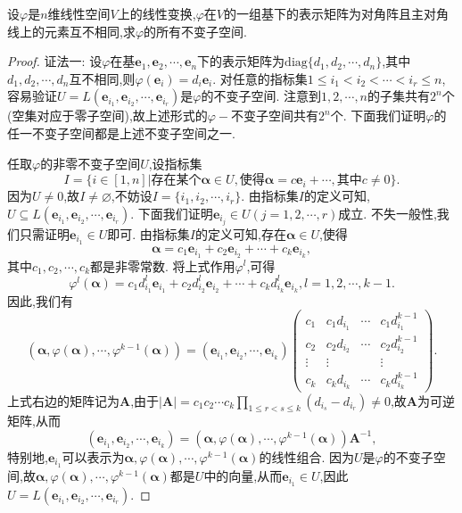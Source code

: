 \documentclass[../../main.tex]{subfiles}%
\begin{document}
\begin{example}
设\(\varphi\)是\(n\)维线性空间\(V\)上的线性变换,\(\varphi\)在\(V\)的一组基下的表示矩阵为对角阵且主对角线上的元素互不相同,求\(\varphi\)的所有不变子空间.
\end{example}
\begin{proof}

{\color{blue}证法一:}
设\(\varphi\)在基\(\boldsymbol{e}_1,\boldsymbol{e}_2,\cdots,\boldsymbol{e}_n\)下的表示矩阵为\(\text{diag}\{d_1,d_2,\cdots,d_n\}\),其中\(d_1,d_2,\cdots,d_n\)互不相同,则\(\varphi(\boldsymbol{e}_i)=d_i\boldsymbol{e}_i\). 对任意的指标集\(1\leqslant  i_1 < i_2 < \cdots < i_r\leqslant  n\),容易验证\(U = L(\boldsymbol{e}_{i_1},\boldsymbol{e}_{i_2},\cdots,\boldsymbol{e}_{i_r})\)是\(\varphi\)的不变子空间. 注意到\(1,2,\cdots,n\)的子集共有\(2^n\)个(空集对应于零子空间),故上述形式的\(\varphi -\)不变子空间共有\(2^n\)个. 下面我们证明\(\varphi\)的任一不变子空间都是上述不变子空间之一.

任取\(\varphi\)的非零不变子空间\(U\),设指标集
\[
I = \{i\in[1,n]|\text{存在某个}\boldsymbol{\alpha}\in U,\text{使得}\boldsymbol{\alpha}=c\boldsymbol{e}_i + \cdots,\text{其中}c\neq 0\}.
\]
因为\(U\neq 0\),故\(I\neq\varnothing\),不妨设\(I = \{i_1,i_2,\cdots,i_r\}\). 由指标集\(I\)的定义可知,\(U\subseteq L(\boldsymbol{e}_{i_1},\boldsymbol{e}_{i_2},\cdots,\boldsymbol{e}_{i_r})\). 下面我们证明\(\boldsymbol{e}_{i_j}\in U(j = 1,2,\cdots,r)\)成立. 不失一般性,我们只需证明\(\boldsymbol{e}_{i_1}\in U\)即可. 由指标集\(I\)的定义可知,存在\(\boldsymbol{\alpha}\in U\),使得
\[
\boldsymbol{\alpha}=c_1\boldsymbol{e}_{i_1}+c_2\boldsymbol{e}_{i_2}+\cdots + c_k\boldsymbol{e}_{i_k},
\]
其中\(c_1,c_2,\cdots,c_k\)都是非零常数. 将上式作用\(\varphi^l\),可得
\[
\varphi^l(\boldsymbol{\alpha})=c_1d_{i_1}^l\boldsymbol{e}_{i_1}+c_2d_{i_2}^l\boldsymbol{e}_{i_2}+\cdots + c_kd_{i_k}^l\boldsymbol{e}_{i_k},l = 1,2,\cdots,k - 1.
\]
因此,我们有
\[
(\boldsymbol{\alpha},\varphi(\boldsymbol{\alpha}),\cdots,\varphi^{k - 1}(\boldsymbol{\alpha}))=(\boldsymbol{e}_{i_1},\boldsymbol{e}_{i_2},\cdots,\boldsymbol{e}_{i_k})
\begin{pmatrix}
c_1&c_1d_{i_1}&\cdots&c_1d_{i_1}^{k - 1}\\
c_2&c_2d_{i_2}&\cdots&c_2d_{i_2}^{k - 1}\\
\vdots&\vdots&&\vdots\\
c_k&c_kd_{i_k}&\cdots&c_kd_{i_k}^{k - 1}
\end{pmatrix}.
\]
上式右边的矩阵记为\(\boldsymbol{A}\),由于\(|\boldsymbol{A}| = c_1c_2\cdots c_k\prod_{1\leqslant  r < s\leqslant  k}(d_{i_s}-d_{i_r})\neq 0\),故\(\boldsymbol{A}\)为可逆矩阵,从而
\[
(\boldsymbol{e}_{i_1},\boldsymbol{e}_{i_2},\cdots,\boldsymbol{e}_{i_k})=(\boldsymbol{\alpha},\varphi(\boldsymbol{\alpha}),\cdots,\varphi^{k - 1}(\boldsymbol{\alpha}))\boldsymbol{A}^{-1},
\]
特别地,\(\boldsymbol{e}_{i_1}\)可以表示为\(\boldsymbol{\alpha},\varphi(\boldsymbol{\alpha}),\cdots,\varphi^{k - 1}(\boldsymbol{\alpha})\)的线性组合. 因为\(U\)是\(\varphi\)的不变子空间,故\(\boldsymbol{\alpha},\varphi(\boldsymbol{\alpha}),\cdots,\varphi^{k - 1}(\boldsymbol{\alpha})\)都是\(U\)中的向量,从而\(\boldsymbol{e}_{i_1}\in U\),因此\(U = L(\boldsymbol{e}_{i_1},\boldsymbol{e}_{i_2},\cdots,\boldsymbol{e}_{i_r})\).


\end{proof}
\end{document}
